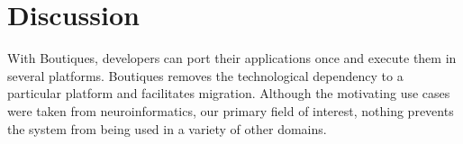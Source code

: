 \documentclass{article}
\newcommand{\boutiques}{Boutiques\xspace}
\begin{document}

\section{Discussion}
With \boutiques, developers can port their applications once and execute
them in several platforms. \boutiques removes the technological dependency to a
particular platform and facilitates migration.  Although the
motivating use cases were taken from neuroinformatics, our primary
field of interest, nothing prevents the system from being used in a
variety of other domains.
\end{document}
